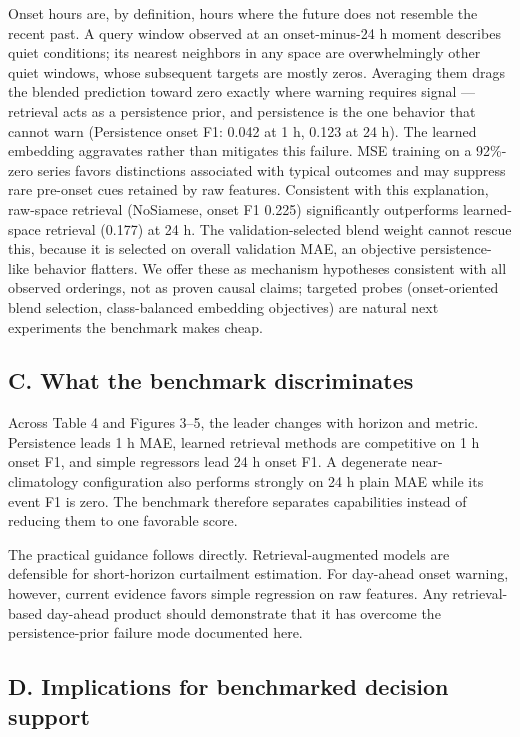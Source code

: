 \documentclass[
  10pt,
  a4paper,
]{article}
\begin{document}
Onset hours are, by definition, hours where the future does not resemble
the recent past. A query window observed at an onset-minus-24 h moment
describes quiet conditions; its nearest neighbors in any space are
overwhelmingly other quiet windows, whose subsequent targets are mostly
zeros. Averaging them drags the blended prediction toward zero exactly
where warning requires signal --- retrieval acts as a persistence prior,
and persistence is the one behavior that cannot warn (Persistence onset
F1: 0.042 at 1 h, 0.123 at 24 h). The learned embedding aggravates
rather than mitigates this failure. MSE training on a 92\%-zero series
favors distinctions associated with typical outcomes and may suppress
rare pre-onset cues retained by raw features. Consistent with this
explanation, raw-space retrieval (NoSiamese, onset F1 0.225)
significantly outperforms learned-space retrieval (0.177) at 24 h. The
validation-selected blend weight cannot rescue this, because it is
selected on overall validation MAE, an objective persistence-like
behavior flatters. We offer these as mechanism hypotheses consistent
with all observed orderings, not as proven causal claims; targeted
probes (onset-oriented blend selection, class-balanced embedding
objectives) are natural next experiments the benchmark makes cheap.

\subsection{C. What the benchmark
discriminates}\label{c.-what-the-benchmark-discriminates}

Across Table 4 and Figures 3--5, the leader changes with horizon and
metric. Persistence leads 1 h MAE, learned retrieval methods are
competitive on 1 h onset F1, and simple regressors lead 24 h onset F1. A
degenerate near-climatology configuration also performs strongly on 24 h
plain MAE while its event F1 is zero. The benchmark therefore separates
capabilities instead of reducing them to one favorable score.

The practical guidance follows directly. Retrieval-augmented models are
defensible for short-horizon curtailment estimation. For day-ahead onset
warning, however, current evidence favors simple regression on raw
features. Any retrieval-based day-ahead product should demonstrate that
it has overcome the persistence-prior failure mode documented here.

\subsection{D. Implications for benchmarked decision
support}\label{d.-implications-for-benchmarked-decision-support}
\end{document}
